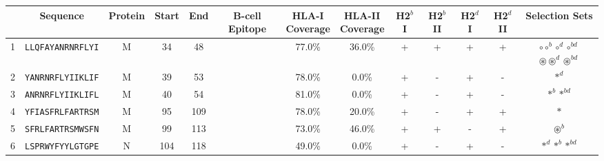 \begin{tabular}{rcccccccccccc}
\toprule
{} &                  Sequence & Protein &  Start &   End & B-cell Epitope & \Centerstack{HLA-I \\ Coverage} & \Centerstack{HLA-II \\ Coverage} & H2$^{b}$ I & H2$^{b}$ II & H2$^{d}$ I & H2$^{d}$ II &                                                                                        Selection Sets \\
\midrule
1  &  \texttt{LLQFAYANRNRFLYI} &       M &     34 &    48 &                &                          77.0\% &                           36.0\% &          + &           + &          + &           + &  \Centerstack{  $\circ \circ^b \circ^d \circ^{bd}$ \\  $\circledast \circledast^d \circledast^{bd}$ } \\
2  &  \texttt{YANRNRFLYIIKLIF} &       M &     39 &    53 &                &                          78.0\% &                            0.0\% &          + &           - &          + &           - &                                                                                            $ \ast^d $ \\
3  &  \texttt{ANRNRFLYIIKLIFL} &       M &     40 &    54 &                &                          81.0\% &                            0.0\% &          + &           - &          + &           - &                                                                                  $ \ast^b \ast^{bd} $ \\
4  &  \texttt{YFIASFRLFARTRSM} &       M &     95 &   109 &                &                          78.0\% &                           20.0\% &          + &           - &          + &           + &                                                                                              $ \ast $ \\
5  &  \texttt{SFRLFARTRSMWSFN} &       M &     99 &   113 &                &                          73.0\% &                           46.0\% &          + &           + &          - &           + &                                                                                     $ \circledast^b $ \\
6  &  \texttt{LSPRWYFYYLGTGPE} &       N &    104 &   118 &                &                          49.0\% &                            0.0\% &          + &           - &          + &           - &                                                                           $ \ast^d \ast^b \ast^{bd} $ \\

\end{tabular}
